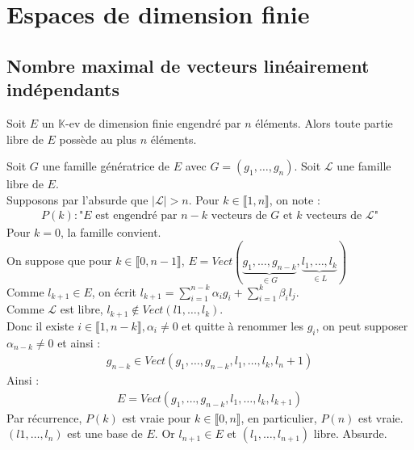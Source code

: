 \documentclass[../main.tex]{subfiles}
\begin{document}
\setcounter{chapter}{21}
\chapter{Espaces de dimension finie}
\tableofcontents
\clearpage

\section{Nombre maximal de vecteurs linéairement indépendants}
\begin{tcolorbox}[title=Propostion 22.3, title filled=false, colframe=lightblue, colback=lightblue!10!white]
    Soit $E$ un $\mathbb{K}$-ev de dimension finie engendré par $n$ éléments. Alors toute partie libre de $E$ possède au plus $n$ éléments. 
\end{tcolorbox}

\noindent Soit $G$ une famille génératrice de $E$ avec $G = (g_1, \ldots, g_n)$. Soit $\mathcal{L}$ une famille libre de $E$. \\
Supposons par l'absurde que $|\mathcal{L}| > n$. Pour $k\in \llbracket 1, n \rrbracket$, on note : 
\begin{align*}
    P(k): \text{"$E$ est engendré par $n-k$ vecteurs de $G$ et $k$ vecteurs de $\mathcal{L}$"}
\end{align*}
Pour $k=0$, la famille convient. \\
On suppose que pour $k \in \llbracket 0, n-1 \rrbracket$, $E = Vect(\underbrace{g_1, \ldots, g_{n-k}}_{\in G}, \underbrace{l_1, \ldots, l_k}_{\in L})$ \\
Comme $l_{k+1} \in E$, on écrit $l_{k+1} = \sum\limits_{i=1}^{n-k} \alpha_i g_i + \sum\limits_{i=1}^k \beta_i l_j$. \\
Comme $\mathcal{L}$ est libre, $l_{k+1} \not\in Vect(l1, \ldots, l_k)$. \\
Donc il existe $i \in \llbracket 1, n-k \rrbracket, \alpha_i \neq 0$ et quitte à renommer les $g_i$, on peut supposer $\alpha_{n-k} \neq 0$ et ainsi : 
\begin{align*}
    g_{n-k} \in Vect(g_1, \ldots, g_{n-k}, l_1, \ldots, l_k, l_n+1)
\end{align*}
Ainsi : 
\begin{align*}
    E = Vect(g_1, \ldots, g_{n-k}, l_1, \ldots, l_k, l_{k+1})
\end{align*}
Par récurrence, $P(k)$ est vraie pour $k\in \llbracket 0, n \rrbracket$, en particulier, $P(n)$ est vraie. \\
$(l1, \ldots, l_n)$ est une base de $E$. Or $l_{n+1} \in E$ et $(l_1, \ldots, l_{n+1})$ libre. 
Absurde. 
\end{document}
